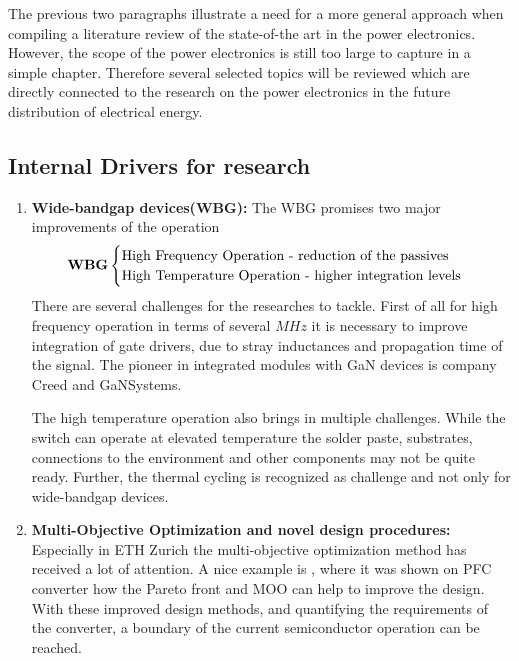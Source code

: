 \documentclass[]{scrartcl}
\begin{document}
The previous two paragraphs illustrate a need for a more general approach when compiling a literature review of the state-of-the art in the power electronics. However, the scope of the power electronics is still too large to capture in a simple chapter. Therefore several selected topics will be reviewed which are directly connected to the research  on the power electronics in the future distribution of electrical energy. 


\subsection{Internal Drivers for research}



\begin{enumerate}
	\item \textbf{Wide-bandgap devices(WBG):} The WBG promises two major improvements of the operation\cite{Kassakian2013}
	\begin{equation*}
	\text{\textbf{WBG}} \begin{cases}
	\text{High Frequency Operation - reduction of the passives } \\
	\text{High Temperature Operation - higher integration levels} 
	\end{cases}
	\end{equation*} 
	There are several challenges for the researches to tackle. First of all for high frequency operation in terms of several $MHz$ it is necessary to improve integration of gate drivers, due to stray inductances and propagation time of the signal. The pioneer in integrated modules with GaN devices is company Creed and GaNSystems. 
	
	The high temperature operation also brings in multiple challenges. While the switch can operate at elevated temperature the solder paste, substrates, connections to the environment and other components may not be quite ready.  Further,  the thermal cycling is recognized as challenge and not only for wide-bandgap devices\cite{Andresen2014a}.
	
	\item \textbf{Multi-Objective Optimization and novel design procedures:} Especially in ETH Zurich the multi-objective optimization method has received a lot of attention. A nice example is \cite{Kolar2009}, where it was shown on PFC converter how the Pareto front and MOO can help to improve the design. With these improved design methods, and quantifying the requirements of the converter, a boundary of the current semiconductor operation can be reached. 
	

\end{enumerate}
\end{document}
